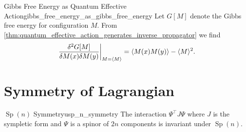 \documentclass{article}
\begin{document}
\begin{example}{Gibbs Free Energy as Quantum Effective Action}{gibbs_free_energy_as_gibbs_free_energy}
    Let $G[M]$ denote the Gibbs free energy for configuration $M$.
    From \cref{thm:quantum_effective_action_generates_inverse_propagator} we find
    \[ \eval{\frac{\delta^2 G[M]}{\delta M(x) \delta M(y)}}_{M=\langle M \rangle} = \langle M(x) M(y) \rangle - \langle M \rangle^2. \]
\end{example}

\section{Symmetry of Lagrangian}

\begin{example}{$\operatorname{Sp}(n)$ Symmetry}{usp_n_symmetry}
    The interaction $\Psi^\intercal J \Psi$ where $J$ is the sympletic form and $\Psi$ is a spinor of $2n$ components is invariant under $\operatorname{Sp}(n)$.
\end{example}

% 
% 
\end{document}
